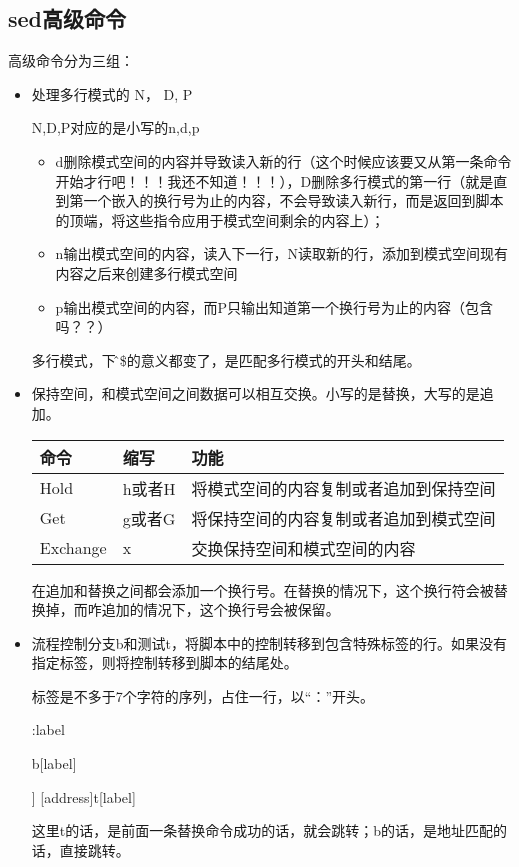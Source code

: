 \subsection{sed高级命令}

高级命令分为三组：
\begin{itemize}
\item 处理多行模式的 N， D, P

N,D,P对应的是小写的n,d,p
\begin{itemize}
\item d删除模式空间的内容并导致读入新的行（这个时候应该要又从第一条命令开始才行吧！！！我还不知道！！！），D删除多行模式的第一行（就是直到第一个嵌入的换行号为止的内容，不会导致读入新行，而是返回到脚本的顶端，将这些指令应用于模式空间剩余的内容上）；
\item n输出模式空间的内容，读入下一行，N读取新的行，添加到模式空间现有内容之后来创建多行模式空间
\item p输出模式空间的内容，而P只输出知道第一个换行号为止的内容（包含吗？？）
\end{itemize}
多行模式，下\^和\$的意义都变了，是匹配多行模式的开头和结尾。

\item 保持空间，和模式空间之间数据可以相互交换。小写的是替换，大写的是追加。
\begin{table}
\begin{tabular}{|l|l|l|}
\hline
命令 & 缩写 & 功能 \\
\hline
Hold & h或者H & 将模式空间的内容复制或者追加到保持空间\\
\hline
Get & g或者G & 将保持空间的内容复制或者追加到模式空间\\
\hline
Exchange & x & 交换保持空间和模式空间的内容\\
\hline
\end{tabular}
\end{table}

在追加和替换之间都会添加一个换行号。在替换的情况下，这个换行符会被替换掉，而咋追加的情况下，这个换行号会被保留。

\item 流程控制分支b和测试t，将脚本中的控制转移到包含特殊标签的行。如果没有指定标签，则将控制转移到脚本的结尾处。

标签是不多于7个字符的序列，占住一行，以“：”开头。

\begin{Command-Line}[行尾的空格会被认为是标签的一部分]
:label
\end{Command-Line}

\begin{Command-Line}[没有给出标签的话就跳转到脚本结尾]
[address]b[label]
\end{Command-Line}

\begin{Command-Line}[[测试，这里是做了一个成功的替换，就会跳转]]
[address]t[label]
\end{Command-Line}

这里t的话，是前面一条替换命令成功的话，就会跳转；b的话，是地址匹配的话，直接跳转。

\end{itemize}


